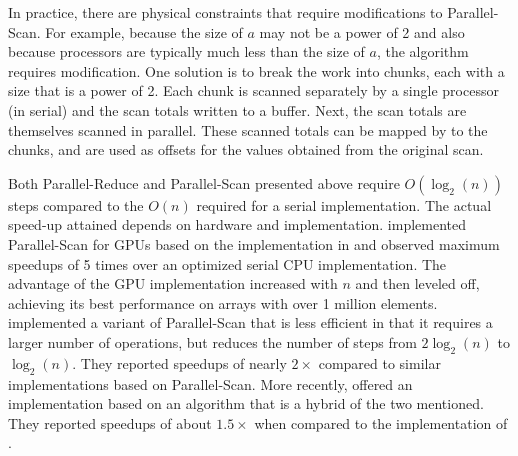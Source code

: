 {%

In practice, there are physical constraints that require modifications to Parallel-Scan. For example, because the size of $a$ may not be a power of 2 and also because processors are typically much less than the size of $a$, the algorithm requires modification. One solution is to break the work into chunks, each with a size that is a power of 2. Each chunk is scanned separately by a single processor (in serial) and the scan totals written to a buffer. Next, the scan totals are themselves scanned in parallel. These scanned totals can be mapped by to the chunks, and are used as offsets for the values obtained from the original scan.

Both Parallel-Reduce and Parallel-Scan presented above require $O(\log_2(n))$ steps compared to the $O(n)$ required for a serial implementation. 
The actual speed-up attained depends on hardware and implementation. \citet{harris-scan} implemented Parallel-Scan for GPUs based on the implementation in \citet{blelloch1990} and observed maximum speedups of 5 times over an optimized serial CPU implementation. The advantage of the GPU implementation increased with $n$ and then leveled off, achieving its best performance on arrays with over 1 million elements. \citet{sengupta2008} implemented a variant of Parallel-Scan that is less efficient in that it requires a larger number of operations, but reduces the number of steps from $2\log_2(n)$ to $\log_2(n)$. They reported speedups of nearly $2\times$ compared to similar implementations based on Parallel-Scan. More recently, \citet{ha2013} offered an implementation based on an algorithm that is a hybrid of the two mentioned. They reported speedups of about $1.5\times$ when compared to the implementation of \citet{sengupta2008}.

}
